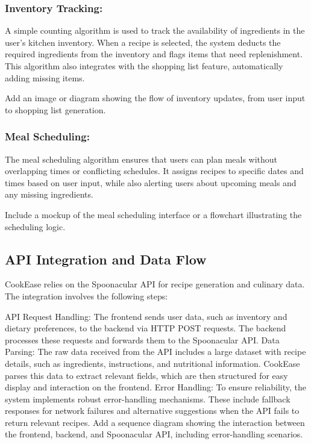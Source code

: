 \documentclass[10pt,twocolumn]{article}
\begin{document}
\subsubsection{Inventory Tracking:}
A simple counting algorithm is used to track the availability of ingredients in the user’s kitchen inventory. When a recipe is selected, the system deducts the required ingredients from the inventory and flags items that need replenishment. This algorithm also integrates with the shopping list feature, automatically adding missing items.

Add an image or diagram showing the flow of inventory updates, from user input to shopping list generation.

\subsubsection{Meal Scheduling:}
The meal scheduling algorithm ensures that users can plan meals without overlapping times or conflicting schedules. It assigns recipes to specific dates and times based on user input, while also alerting users about upcoming meals and any missing ingredients.

Include a mockup of the meal scheduling interface or a flowchart illustrating the scheduling logic.

\subsection{API Integration and Data Flow}
CookEase relies on the Spoonacular API for recipe generation and culinary data. The integration involves the following steps:

API Request Handling: The frontend sends user data, such as inventory and dietary preferences, to the backend via HTTP POST requests. The backend processes these requests and forwards them to the Spoonacular API.
Data Parsing: The raw data received from the API includes a large dataset with recipe details, such as ingredients, instructions, and nutritional information. CookEase parses this data to extract relevant fields, which are then structured for easy display and interaction on the frontend.
Error Handling: To ensure reliability, the system implements robust error-handling mechanisms. These include fallback responses for network failures and alternative suggestions when the API fails to return relevant recipes.
Add a sequence diagram showing the interaction between the frontend, backend, and Spoonacular API, including error-handling scenarios.
\end{document}
